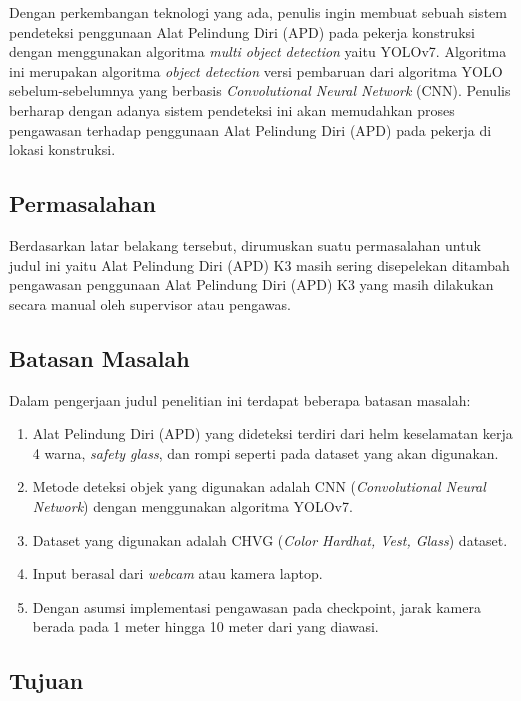 Dengan perkembangan teknologi yang ada, penulis ingin membuat sebuah sistem pendeteksi penggunaan Alat Pelindung Diri (APD) pada pekerja konstruksi dengan menggunakan algoritma \textit{multi object detection} yaitu YOLOv7. Algoritma ini merupakan algoritma \textit{object detection} versi pembaruan dari algoritma YOLO sebelum-sebelumnya yang berbasis \textit{Convolutional Neural Network} (CNN). Penulis berharap dengan adanya sistem pendeteksi ini akan memudahkan proses pengawasan terhadap penggunaan Alat Pelindung Diri (APD) pada pekerja di lokasi konstruksi.

\subsection{Permasalahan}

Berdasarkan latar belakang tersebut, dirumuskan suatu permasalahan untuk judul ini yaitu Alat Pelindung Diri (APD) K3 masih sering disepelekan ditambah pengawasan penggunaan Alat Pelindung Diri (APD) K3 yang masih dilakukan secara manual oleh supervisor atau pengawas.

\subsection{Batasan Masalah}

Dalam pengerjaan judul penelitian ini terdapat beberapa batasan masalah:
\begin{enumerate}[nolistsep]
    \item Alat Pelindung Diri (APD) yang dideteksi terdiri dari helm keselamatan kerja 4 warna, \textit{safety glass}, dan rompi seperti pada dataset yang akan digunakan.
    \item Metode deteksi objek yang digunakan adalah CNN (\emph{Convolutional Neural Network}) dengan menggunakan algoritma YOLOv7.
    \item Dataset yang digunakan adalah CHVG (\textit{Color Hardhat, Vest, Glass}) dataset.
    \item Input berasal dari \emph{webcam} atau kamera laptop.
    \item Dengan asumsi implementasi pengawasan pada checkpoint, jarak kamera berada pada 1 meter hingga 10 meter dari yang diawasi.
\end{enumerate}

\subsection{Tujuan}

